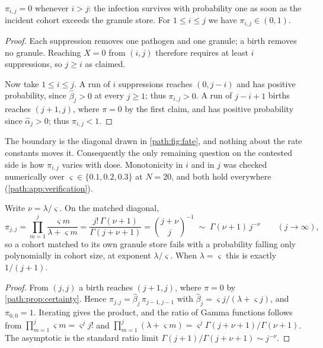 \begin{proposition}
\label{path:prop:certainty}
$\pi_{i,j}=0$ whenever $i>j$: the infection survives with probability one as
soon as the incident cohort exceeds the granule store. For $1\le i\le j$ we
have $\pi_{i,j}\in(0,1)$.
\end{proposition}

\begin{proof}
Each suppression removes one pathogen and one granule; a birth removes no
granule. Reaching $X=0$ from $(i,j)$ therefore requires at least $i$
suppressions, so $j\ge i$ as claimed.

Now take $1\le i\le j$. A run of $i$ suppressions reaches $(0,j-i)$ and has
positive probability, since $\hat\beta_j>0$ at every $j\ge1$; thus
$\pi_{i,j}>0$. A run of $j-i+1$ births reaches $(j+1,j)$, where
$\pi=0$ by the first claim, and has positive probability since
$\hat\alpha_j>0$; thus $\pi_{i,j}<1$.
\end{proof}

The boundary is the diagonal drawn in \cref{path:fig:fate}, and nothing
about the rate constants moves it. Consequently the only remaining question
on the contested side is how $\pi_{i,j}$ varies with dose. Monotonicity in
$i$ and in $j$ was checked numerically over
$\varsigma\in\{0.1,0.2,0.3\}$ at $N=20$, and both hold everywhere
(\cref{path:app:verification}).

\begin{proposition}
\label{path:prop:diagonal}
Write $\nu=\lambda/\varsigma$. On the matched diagonal,
\begin{equation}
\pi_{j,j}
= \prod_{m=1}^{j}\frac{\varsigma m}{\lambda+\varsigma m}
= \frac{j!\,\Gamma(\nu+1)}{\Gamma(j+\nu+1)}
= \binom{j+\nu}{j}^{-1}
\;\sim\; \Gamma(\nu+1)\,j^{-\nu}
\qquad (j\to\infty),
\label{path:eq:diagonal}
\end{equation}
so a cohort matched to its own granule store fails with a probability
falling only polynomially in cohort size, at exponent $\lambda/\varsigma$.
When $\lambda=\varsigma$ this is exactly $1/(j+1)$.
\end{proposition}

\begin{proof}
From $(j,j)$ a birth reaches $(j+1,j)$, where $\pi=0$ by
\cref{path:prop:certainty}. Hence $\pi_{j,j}=\hat\beta_j\,\pi_{j-1,j-1}$
with $\hat\beta_j=\varsigma j/(\lambda+\varsigma j)$, and $\pi_{0,0}=1$.
Iterating gives the product, and the ratio of Gamma functions follows from
$\prod_{m=1}^{j}\varsigma m=\varsigma^{j}j!$ and
$\prod_{m=1}^{j}(\lambda+\varsigma m)=\varsigma^{j}\Gamma(j+\nu+1)/\Gamma(\nu+1)$.
The asymptotic is the standard ratio limit
$\Gamma(j+1)/\Gamma(j+\nu+1)\sim j^{-\nu}$.
\end{proof}

